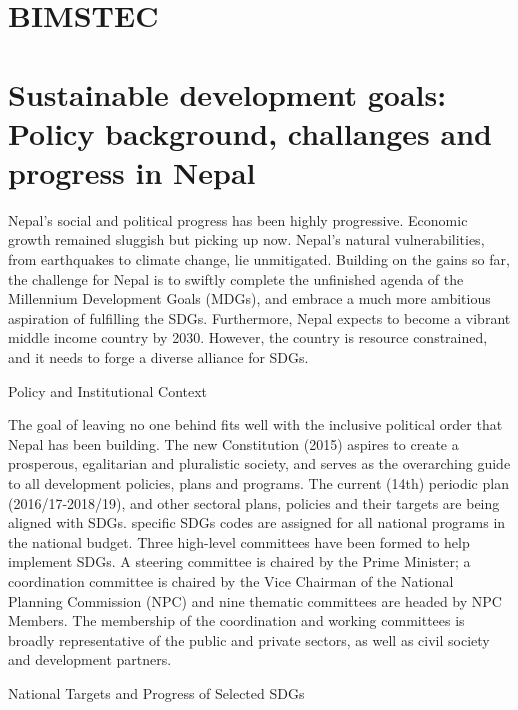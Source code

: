 \documentclass[
  openany]{book}
\begin{document}
\hypertarget{bimstec}{%
\section{BIMSTEC}\label{bimstec}}

\hypertarget{sustainable-development-goals-policy-background-challanges-and-progress-in-nepal}{%
\section{Sustainable development goals: Policy background, challanges and progress in Nepal}\label{sustainable-development-goals-policy-background-challanges-and-progress-in-nepal}}

Nepal's social and political progress has been highly progressive. Economic growth remained sluggish but picking up now. Nepal's natural vulnerabilities, from earthquakes to climate change, lie unmitigated. Building on the gains so far, the challenge for Nepal is to swiftly complete the unfinished agenda of the Millennium Development Goals (MDGs), and embrace a much more ambitious aspiration of fulfilling the SDGs. Furthermore, Nepal expects to become a vibrant middle income country by 2030. However, the country is resource constrained, and it needs to forge a diverse alliance for SDGs.

Policy and Institutional Context

The goal of leaving no one behind fits well with the inclusive political order that Nepal has been building. The new Constitution (2015) aspires to create a prosperous, egalitarian and pluralistic society, and serves as the overarching guide to all development policies, plans and programs. The current (14th) periodic plan (2016/17-2018/19), and other sectoral plans, policies and their targets are being aligned with SDGs. specific SDGs codes are assigned for all national programs in the national budget. Three high-level committees have been formed to help implement SDGs. A steering committee is chaired by the Prime Minister; a coordination committee is chaired by the Vice Chairman of the National Planning Commission (NPC) and nine thematic committees are headed by NPC Members. The membership of the coordination and working committees is broadly representative of the public and private sectors, as well as civil society and development partners.

National Targets and Progress of Selected SDGs
\end{document}
